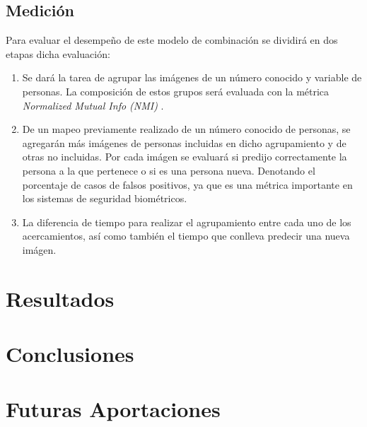 \documentclass[letterpaper, 10 pt, conference]{ieeeconf}  %
\begin{document}
    \subsection{Medición}
    Para evaluar el desempeño de este modelo de combinación se dividirá en dos etapas dicha
    evaluación:
    \begin{enumerate}
        \item Se dará la tarea de agrupar las imágenes de un número conocido y variable de
            personas. La composición de estos grupos será evaluada con la métrica
            \textit{Normalized Mutual Info (NMI)} \cite{NMI}.
        \item De un mapeo previamente realizado de un número conocido de personas, se agregarán
            más imágenes de personas incluidas en dicho agrupamiento y de otras no incluidas. Por
            cada imágen se evaluará si predijo correctamente la persona a la que pertenece o si
            es una persona nueva. Denotando el porcentaje de casos de falsos positivos,
            ya que es una métrica importante en los sistemas de seguridad biométricos.
        \item La diferencia de tiempo para realizar el agrupamiento entre cada uno de los
            acercamientos, así como también el tiempo que conlleva predecir una nueva imágen.
    \end{enumerate}

    \section{Resultados}

    \section{Conclusiones}

    \section{Futuras Aportaciones}

\end{document}

